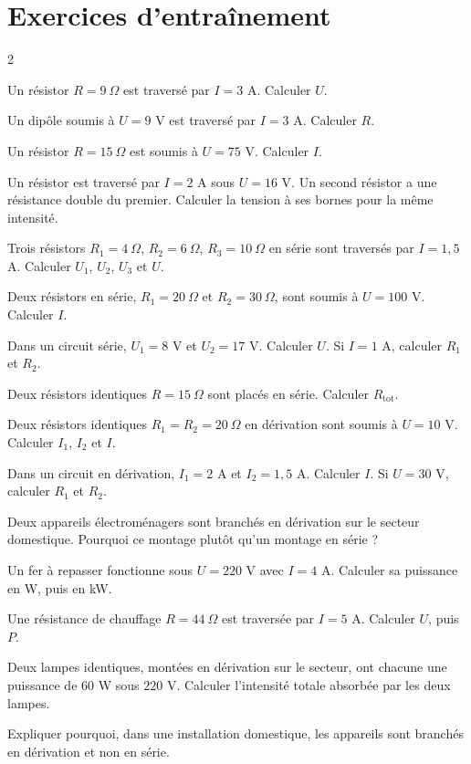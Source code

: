 \section{Exercices d'entraînement}
\begin{multicols}{2}

\exo{} Un résistor $R=9\ \Omega$ est traversé par $I=3$ A. Calculer $U$.

\exo{} Un dipôle soumis à $U=9$ V est traversé par $I=3$ A. Calculer $R$.

\exo{} Un résistor $R=15\ \Omega$ est soumis à $U=75$ V. Calculer $I$.

\exo{} Un résistor est traversé par $I=2$ A sous $U=16$ V. Un second résistor a une
résistance double du premier. Calculer la tension à ses bornes pour la même intensité.

\exo{} Trois résistors $R_1=4\ \Omega$, $R_2=6\ \Omega$, $R_3=10\ \Omega$ en série
sont traversés par $I=1{,}5$ A. Calculer $U_1$, $U_2$, $U_3$ et $U$.

\exo{} Deux résistors en série, $R_1=20\ \Omega$ et $R_2=30\ \Omega$, sont soumis à
$U=100$ V. Calculer $I$.

\exo{} Dans un circuit série, $U_1=8$ V et $U_2=17$ V. Calculer $U$. Si $I=1$ A,
calculer $R_1$ et $R_2$.

\exo{} Deux résistors identiques $R=15\ \Omega$ sont placés en série. Calculer
$R_{\text{tot}}$.

\exo{} Deux résistors identiques $R_1=R_2=20\ \Omega$ en dérivation sont soumis à
$U=10$ V. Calculer $I_1$, $I_2$ et $I$.

\exo{} Dans un circuit en dérivation, $I_1=2$ A et $I_2=1{,}5$ A. Calculer $I$. Si
$U=30$ V, calculer $R_1$ et $R_2$.

\exo{} Deux appareils électroménagers sont branchés en dérivation sur le secteur
domestique. Pourquoi ce montage plutôt qu'un montage en série ?

\exo{} Un fer à repasser fonctionne sous $U=220$ V avec $I=4$ A. Calculer sa
puissance en W, puis en kW.

\exo{} Une résistance de chauffage $R=44\ \Omega$ est traversée par $I=5$ A.
Calculer $U$, puis $P$.

\exo{} Deux lampes identiques, montées en dérivation sur le secteur, ont chacune
une puissance de $60$ W sous $220$ V. Calculer l'intensité totale absorbée par les deux
lampes.

\exo{} Expliquer pourquoi, dans une installation domestique, les appareils sont
branchés en dérivation et non en série.

\end{multicols}


